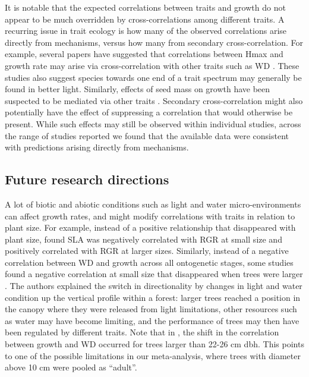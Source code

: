 \documentclass[a4paper,11pt]{article}
\begin{document}
It is notable that the expected correlations between traits and growth do not appear to be much overridden by cross-correlations among different traits. A recurring issue in trait ecology is how many of the observed correlations arise directly from mechanisms, versus how many from secondary cross-correlation. For example, several papers have suggested that correlations between Hmax and growth rate may arise via cross-correlation with other traits such as WD \citep{Thomas:1996do, Poorter:2006vb, Wright:2010tp}. These studies also suggest species towards one end of a trait spectrum may generally be found in better light. Similarly, effects of seed mass on growth have been suspected to be mediated via other traits \citep{Shipley:1990js,Westoby:2002ft,Poorter:2006vb}. Secondary cross-correlation might also potentially have the effect of suppressing a correlation that would otherwise be present. While such effects may still be observed within individual studies, across the range of studies reported we found that the available data were consistent with predictions arising directly from mechanisms.

\subsection*{Future research directions}

A lot of biotic and abiotic conditions such as light and water micro-environments can affect growth rates, and might modify correlations with traits in relation to plant size. For example, instead of a positive relationship that disappeared with plant size, \citet{Iida:2014ep} found SLA was negatively correlated with RGR at small size and positively correlated with RGR at larger sizes. Similarly, instead of a negative correlation between WD and growth across all ontogenetic stages, some studies found a negative correlation at small size that disappeared when trees were larger \citep{Iida:2014ep,Iida:2014hq}. The authors explained the switch in directionality by changes in light and water condition up the vertical profile within a forest: larger trees reached a position in the canopy where they were released from light limitations, other resources such as water may have become limiting, and the performance of trees may then have been regulated by different traits. Note that in \citet{Iida:2014hq}, the shift in the correlation between growth and WD occurred for trees larger than 22-26 cm dbh. This points to one of the possible limitations in our meta-analysis, where trees with diameter above 10 cm were pooled as ``adult''.
\end{document}
